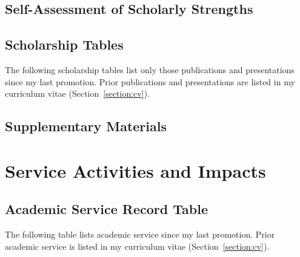 \documentclass[11pt,openany,oneside]{book}
\begin{document}
\chapter{Self-Assessment of Scholarly Strengths}


\chapter{Scholarship Tables}  %
The following scholarship tables list only those publications and presentations since my last promotion.
Prior publications and presentations are listed in my curriculum vitae (Section~\ref{section:cv}).



\chapter{Supplementary Materials}  %

\begin{supplements}[
    directory=supplements/scholarship/,
    section=section,
    structure=enumerate,
    type=publications,
]
\end{supplements}


\part{Service Activities and Impacts}\label{part:service}  %

\chapter{Academic Service Record Table}  %
The following table lists academic service since my last promotion.
Prior academic service is listed in my curriculum vitae (Section~\ref{section:cv}).
\end{document}
